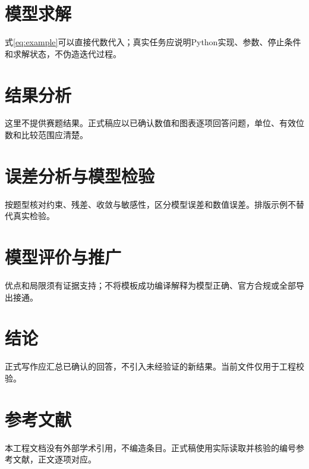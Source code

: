 \documentclass[UTF8,fontset=none,12pt,a4paper]{ctexart}
\begin{document}
\section{模型求解}
式\eqref{eq:example}可以直接代数代入；真实任务应说明Python实现、参数、停止条件和求解状态，不伪造迭代过程。
\section{结果分析}
这里不提供赛题结果。正式稿应以已确认数值和图表逐项回答问题，单位、有效位数和比较范围应清楚。
\section{误差分析与模型检验}
按题型核对约束、残差、收敛与敏感性，区分模型误差和数值误差。排版示例不替代真实检验。
\section{模型评价与推广}
优点和局限须有证据支持；不将模板成功编译解释为模型正确、官方合规或全部导出接通。
\section{结论}
正式写作应汇总已确认的回答，不引入未经验证的新结果。当前文件仅用于工程校验。
\section{参考文献}
本工程文档没有外部学术引用，不编造条目。正式稿使用实际读取并核验的编号参考文献，正文逐项对应。
\end{document}
